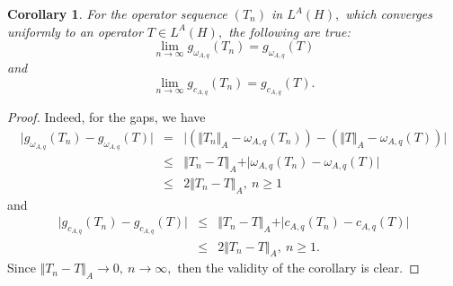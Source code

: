\documentclass[preprint,12pt,3p]{elsarticle}
\newtheorem{corollary}{Corollary}
\begin{document}
\begin{corollary}
\label{cor2}
For the operator sequence $ (T_{n}) $ in $ L^{A}(H), $ which  converges uniformly to an operator $ T\in L^{A}(H), $ the following are true:
$$
\lim\limits_{n\rightarrow\infty}g_{\omega_{A,q}}(T_{n})=g_{\omega_{A,q}}(T)
$$
and 
$$
\lim\limits_{n\rightarrow\infty}g_{c_{A,q}}(T_{n})=g_{c_{A,q}}(T) .
$$
\end{corollary}
\begin{proof}
Indeed, for the gaps, we have
\begin{eqnarray}
\vert g_{\omega_{A,q}}(T_{n})-g_{\omega_{A,q}}(T)\vert & = & \vert \left( \Vert T_{n} \Vert_{A}- \omega_{A,q}(T_{n})\right) -\left( \Vert T \Vert_{A}-\omega_{A,q}(T)\right) \vert  \nonumber \\
& \leq & \Vert T_{n}-T \Vert_{A} + \vert \omega_{A,q}(T_{n}) -\omega_{A,q}(T)\vert \nonumber \\
& \leq & 2 \Vert T_{n}-T \Vert_{A}, \ n \geq 1 \nonumber
\end{eqnarray}
and 
\begin{eqnarray}
\vert g_{c_{{A,q}}}(T_{n})-g_{c_{{A,q}}}(T)\vert 
& \leq & \Vert T_{n}-T \Vert_{A} + \vert c_{A,q}(T_{n}) -c_{A,q}(T)\vert \nonumber \\
& \leq & 2 \Vert T_{n}-T \Vert_{A}, \ n \geq 1. \nonumber 
\end{eqnarray}
Since $ \Vert T_{n}-T \Vert_{A}\rightarrow 0, \ n\rightarrow\infty, $ then the validity of the corollary is clear.
\end{proof}
\setcounter{section}{2}
\end{document}
